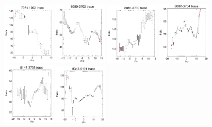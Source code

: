\documentclass[fleqn,usenatbib]{mnras}
\begin{document}
\begin{figure}
    \centering
    \includegraphics[width=0.24\textwidth]{Images/SN1-MC250/CPSBs/7694-1902-1-250.png}
    \includegraphics[width=0.24\textwidth]{Images/SN1-MC250/CPSBs/8080-3702-1-250.png}
    \includegraphics[width=0.24\textwidth]{Images/SN1-MC250/CPSBs/8081-3702-1-250.png}
    \includegraphics[width=0.24\textwidth]{Images/SN1-MC250/CPSBs/8082-3704-1-250.png}
    \includegraphics[width=0.24\textwidth]{Images/SN1-MC250/CPSBs/8143-3703-1-250.png}
    \includegraphics[width=0.24\textwidth]{Images/SN1-MC250/CPSBs/8313-6101-1-250.png}

\end{figure}
\end{document}
